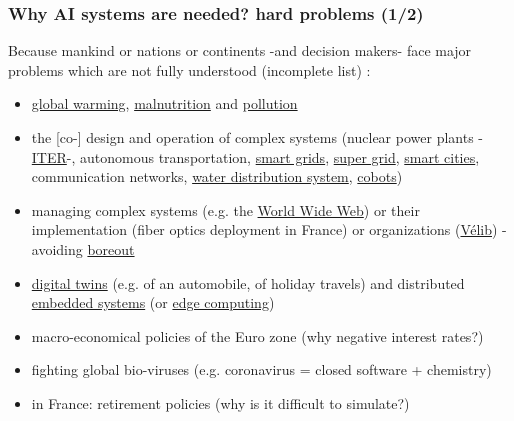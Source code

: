 \documentclass[xcolor=svgnames,final,smaller,a4]{beamer}
\begin{document}
 \begin{frame}
   \frametitle{Why AI systems are needed? hard problems (1/2)}

   Because mankind or nations or continents -and decision makers-
   face major problems which are not fully understood (incomplete list) :

   \begin{itemize}
   \item \href{https://en.wikipedia.org/wiki/Global\_warming}{global
     warming},
     \href{https://en.wikipedia.org/wiki/Malnutrition}{malnutrition}
     and \href{https://en.wikipedia.org/wiki/Pollution}{pollution}
   \item the [co-] design and operation of complex systems (nuclear
     power plants -\href{https://en.wikipedia.org/wiki/ITER}{ITER}-,
     autonomous transportation,
     \href{https://en.wikipedia.org/wiki/Smart_grid}{smart grids}, \href{https://en.wikipedia.org/wiki/Super_grid}{super grid},
     \href{https://en.wikipedia.org/wiki/Smart_city}{smart cities},
     communication networks,
     \href{https://en.wikipedia.org/wiki/Water\_distribution\_system}{water
       distribution system},
     \href{https://en.wikipedia.org/wiki/Cobot}{cobots})
   \item managing complex systems (e.g. the
     \href{https://en.wikipedia.org/wiki/World\_Wide\_Web}{World Wide
       Web}) or their implementation (fiber optics deployment in
     France) or organizations
     (\href{https://www.velib-metropole.fr/}{Vélib}) - avoiding \href{https://en.wikipedia.org/wiki/Boreout}{boreout}
     \item \href{https://en.wikipedia.org/wiki/Digital_twin}{digital
       twins} (e.g. of an automobile, of holiday travels) and
       distributed
       \href{https://en.wikipedia.org/wiki/Embedded_system}{embedded
         systems} (or
       \href{https://en.wikipedia.org/wiki/Edge_computing}{edge
         computing})
     \item macro-economical policies of the Euro zone (why negative interest rates?)
     \item fighting global bio-viruses (e.g. coronavirus = closed
       software + chemistry)
   \item in France: retirement policies (why is it difficult to simulate?)
   \end{itemize}

 \end{frame}
\end{document}
